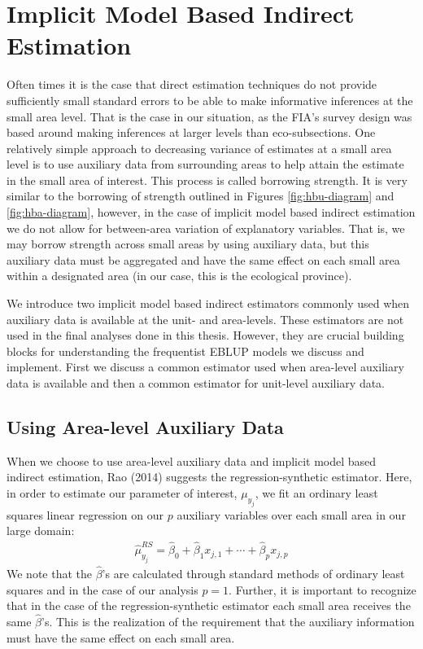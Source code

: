 \documentclass[12pt,twoside]{reedthesis}
\begin{document}
\hypertarget{implicit-model-based-indirect-estimation}{%
\section{Implicit Model Based Indirect Estimation}\label{implicit-model-based-indirect-estimation}}

Often times it is the case that direct estimation techniques do not provide sufficiently small standard errors to be able to make informative inferences at the small area level. That is the case in our situation, as the FIA's survey design was based around making inferences at larger levels than eco-subsections. One relatively simple approach to decreasing variance of estimates at a small area level is to use auxiliary data from surrounding areas to help attain the estimate in the small area of interest. This process is called borrowing strength. It is very similar to the borrowing of strength outlined in Figures \ref{fig:hbu-diagram} and \ref{fig:hba-diagram}, however, in the case of implicit model based indirect estimation we do not allow for between-area variation of explanatory variables. That is, we may borrow strength across small areas by using auxiliary data, but this auxiliary data must be aggregated and have the same effect on each small area within a designated area (in our case, this is the ecological province).

We introduce two implicit model based indirect estimators commonly used when auxiliary data is available at the unit- and area-levels. These estimators are not used in the final analyses done in this thesis. However, they are crucial building blocks for understanding the frequentist EBLUP models we discuss and implement. First we discuss a common estimator used when area-level auxiliary data is available and then a common estimator for unit-level auxiliary data.

\hypertarget{using-area-level-auxiliary-data}{%
\subsection{Using Area-level Auxiliary Data}\label{using-area-level-auxiliary-data}}

When we choose to use area-level auxiliary data and implicit model based indirect estimation, Rao (2014) suggests the regression-synthetic estimator. Here, in order to estimate our parameter of interest, \(\mu_{y_j}\), we fit an ordinary least squares linear regression on our \(p\) auxiliary variables over each small area in our large domain:
\begin{align}
\hat\mu_{y_j}^{RS} = \hat\beta_0 + \hat\beta_1 x_{j,1} + \cdots + \hat\beta_p x_{j,p}
\end{align}
We note that the \(\hat \beta\)'s are calculated through standard methods of ordinary least squares and in the case of our analysis \(p=1\). Further, it is important to recognize that in the case of the regression-synthetic estimator each small area receives the same \(\hat\beta\)'s. This is the realization of the requirement that the auxiliary information must have the same effect on each small area.
\end{document}
